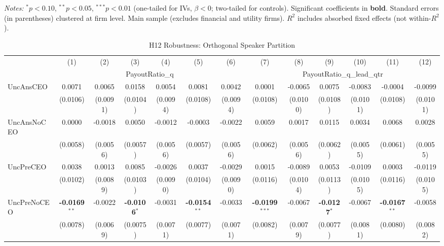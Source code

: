 \documentclass[11pt,a4paper]{article}
\begin{document}
\begin{table}[htbp]
\begin{tabular}{lcccccccccccc}
\bottomrule
\end{tabular}
\begin{minipage}{\linewidth}
\vspace{2pt}\scriptsize
\textit{Notes:} $^{*}p<0.10$, $^{**}p<0.05$, $^{***}p<0.01$ (one-tailed for IVs, $\beta < 0$; two-tailed for controls).
 Significant coefficients in \textbf{bold}.
 Standard errors (in parentheses) clustered at firm level.
 Main sample (excludes financial and utility firms).
 $R^2$ includes absorbed fixed effects (not within-$R^2$).
\end{minipage}
\end{table}
\clearpage
\begin{table}[htbp]
\centering
\caption{H12 Robustness: Orthogonal Speaker Partition}
\label{tab:h12_robust}
\scriptsize
\begin{tabular}{lcccccccccccc}
\toprule
 & (1) & (2) & (3) & (4) & (5) & (6) & (7) & (8) & (9) & (10) & (11) & (12) \\
 & \multicolumn{6}{c}{PayoutRatio\_q} & \multicolumn{6}{c}{PayoutRatio\_q\_lead\_qtr} \\
\cmidrule(lr){2-7} \cmidrule(lr){8-13}
\midrule
UncAnsCEO & 0.0071 & 0.0065 & 0.0158 & 0.0054 & 0.0081 & 0.0042 & 0.0001 & -0.0065 & 0.0075 & -0.0083 & -0.0004 & -0.0099 \\
 & (0.0106) & (0.0091) & (0.0104) & (0.0094) & (0.0108) & (0.0094) & (0.0108) & (0.0100) & (0.0108) & (0.0101) & (0.0108) & (0.0101) \\
UncAnsNoCEO & 0.0000 & -0.0018 & 0.0050 & -0.0012 & -0.0003 & -0.0022 & 0.0059 & 0.0017 & 0.0115 & 0.0034 & 0.0068 & 0.0028 \\
 & (0.0058) & (0.0056) & (0.0057) & (0.0056) & (0.0057) & (0.0056) & (0.0062) & (0.0056) & (0.0062) & (0.0055) & (0.0061) & (0.0055) \\
UncPreCEO & 0.0038 & 0.0013 & 0.0085 & -0.0026 & 0.0037 & -0.0029 & 0.0015 & -0.0089 & 0.0053 & -0.0109 & 0.0003 & -0.0119 \\
 & (0.0102) & (0.0089) & (0.0103) & (0.0090) & (0.0104) & (0.0090) & (0.0116) & (0.0104) & (0.0113) & (0.0105) & (0.0116) & (0.0105) \\
UncPreNoCEO & \textbf{-0.0169}$^{**}$ & -0.0022 & \textbf{-0.0106}$^{*}$ & -0.0031 & \textbf{-0.0154}$^{**}$ & -0.0033 & \textbf{-0.0199}$^{***}$ & -0.0067 & \textbf{-0.0127}$^{*}$ & -0.0067 & \textbf{-0.0167}$^{**}$ & -0.0058 \\
 & (0.0078) & (0.0069) & (0.0075) & (0.0071) & (0.0077) & (0.0071) & (0.0082) & (0.0079) & (0.0077) & (0.0081) & (0.0080) & (0.0082) \\

\end{tabular}
\end{table}
\end{document}
